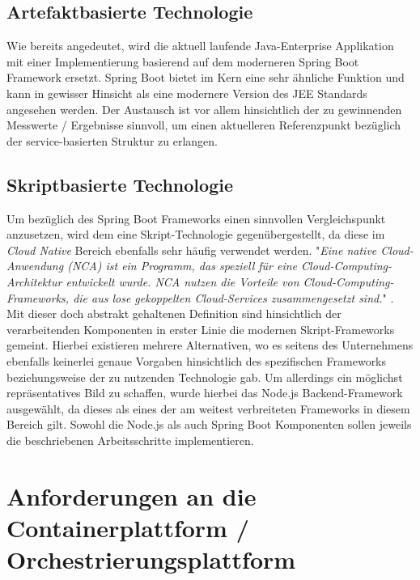 \subsection{Artefaktbasierte Technologie}
Wie bereits angedeutet, wird die aktuell laufende Java-Enterprise Applikation mit einer Implementierung basierend auf dem moderneren Spring Boot Framework ersetzt. Spring Boot bietet im Kern eine sehr ähnliche Funktion und kann in gewisser Hinsicht als eine modernere Version des JEE Standards angesehen werden. Der Austausch ist vor allem hinsichtlich der zu gewinnenden Messwerte / Ergebnisse sinnvoll, um einen aktuelleren Referenzpunkt bezüglich der service-basierten Struktur zu erlangen.

\subsection{Skriptbasierte Technologie}


Um bezüglich des Spring Boot Frameworks einen sinnvollen Vergleichspunkt anzusetzen, wird dem eine Skript-Technologie gegenübergestellt, da diese im \emph{Cloud Native} Bereich ebenfalls sehr häufig verwendet werden. "\emph{Eine native Cloud-Anwendung (NCA) ist ein Programm, das speziell für eine Cloud-Computing-Architektur entwickelt wurde. NCA nutzen die Vorteile von Cloud-Computing-Frameworks, die aus lose gekoppelten Cloud-Services zusammengesetzt sind.}" \cite{def-nca}. Mit dieser doch abstrakt gehaltenen Definition sind hinsichtlich der verarbeitenden Komponenten in erster Linie die modernen Skript-Frameworks gemeint. Hierbei existieren mehrere Alternativen, wo es seitens des Unternehmens ebenfalls keinerlei genaue Vorgaben hinsichtlich des spezifischen Frameworks beziehungsweise der zu nutzenden Technologie gab. Um allerdings ein möglichst repräsentatives Bild zu schaffen, wurde hierbei das Node.js Backend-Framework ausgewählt, da dieses als eines der am weitest verbreiteten Frameworks in diesem Bereich gilt. Sowohl die Node.js als auch Spring Boot Komponenten sollen jeweils die beschriebenen Arbeitsschritte implementieren.


\section{Anforderungen an die Containerplattform / Orchestrierungsplattform}
\label{sec:anforderungPlattform}


